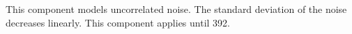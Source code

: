 This component models uncorrelated noise.
The standard deviation of the noise decreases linearly.
This component applies until  392.